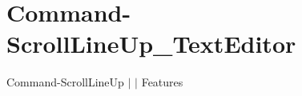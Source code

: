 \chapter{Command-\/\+Scroll\+Line\+Up\+\_\+\+Text\+Editor }
\hypertarget{md__docs_2_text_editor_2_features_2_command-_scroll_line_up___text_editor}{}\label{md__docs_2_text_editor_2_features_2_command-_scroll_line_up___text_editor}
Command-\/\+Scroll\+Line\+Up \texorpdfstring{$\vert$}{|}  \texorpdfstring{$\vert$}{|} Features



 